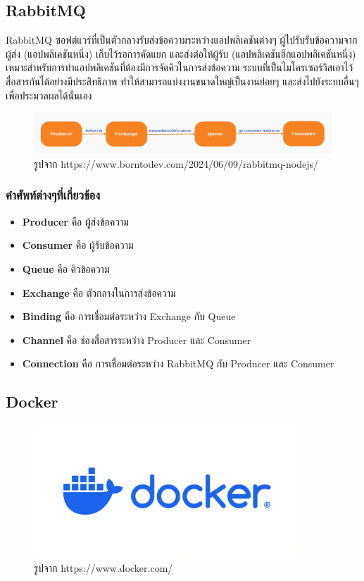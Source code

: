\subsection{RabbitMQ}
\hspace{1.27cm}RabbitMQ \cite{rabbitmq}ซอฟต์แวร์ที่เป็นตัวกลางรับส่งข้อความระหว่างแอปพลิเคชันต่างๆ ผู้ไปรับรับข้อความจากผู้ส่ง (แอปพลิเคชันหนึ่ง) เก็บไว้รอการคัดแยก และส่งต่อให้ผู้รับ (แอปพลิเคชันอีกแอปพลิเคชันหนึ่ง) เหมาะสำหรับการทำแอปพลิเคชันที่ต้องมีการจัดคิวในการส่งข้อความ ระบบที่เป็นไมโครเซอร์วิสเอาไว้สื่อสารกันได้อย่างมีประสิทธิภาพ ทำให้สามารถแบ่งงานขนาดใหญ่เป็นงานย่อยๆ และส่งไปยังระบบอื่นๆ เพื่อประมวลผลได้นั่นเอง
\begin{figure}[H] %
    \centering
    \includegraphics[width=\linewidth, keepaspectratio]{pictures/rabbitmq.png}
    \caption[Poem]{รูปจาก https://www.borntodev.com/2024/06/09/rabbitmq-nodejs/}
    \label{fig:rabbitmq}
\end{figure}
  \subsubsection{คำศัพท์ต่างๆที่เกี่ยวข้อง}
  \begin{itemize}
    \item \textbf{Producer} คือ ผู้ส่งข้อความ
    \item \textbf{Consumer} คือ ผู้รับข้อความ
    \item \textbf{Queue} คือ คิวข้อความ
    \item \textbf{Exchange} คือ ตัวกลางในการส่งข้อความ
    \item \textbf{Binding} คือ การเชื่อมต่อระหว่าง Exchange กับ Queue
    \item \textbf{Channel} คือ ช่องสื่อสารระหว่าง Producer และ Consumer
    \item \textbf{Connection} คือ การเชื่อมต่อระหว่าง RabbitMQ กับ Producer และ Consumer
  \end{itemize}
\subsection{Docker}
\begin{figure}[H]
  \centering
  \includegraphics[width=100mm, keepaspectratio ]{pictures/docker.png}
  \caption[Poem]{รูปจาก https://www.docker.com/}
  \label{fig:docker}
\end{figure}

